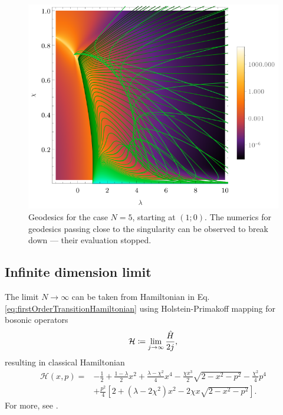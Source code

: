 \begin{figure}[H]
    \centering
    \includegraphics[scale=1.3]{../img/N=5_geods00.pdf}
    \caption{Geodesics for the case $N=5$, starting at $(1;0)$. The numerics for geodesics passing close to the singularity can be observed to break down — their evaluation stopped.}
    \label{fig:geod10}    
\end{figure}







\subsection{Infinite dimension limit}
\label{chap:infiniteDimensionLimit}
The limit $N\rightarrow \infty$ can be taken from Hamiltonian in Eq. \ref{eq:firstOrderTransitionHamiltonian} using Holstein-Primakoff mapping \citet{holstein} for bosonic operators
\begin{equation}
    \mathcal{H}\coloneqq\lim_{j\rightarrow\infty}\frac{\hat{H}}{2j},
\end{equation}
resulting in classical Hamiltonian
\begin{equation}
    \begin{split}
        \mathcal{H}(x,p)=&-\frac{1}{2}+\frac{1-\lambda}{2}x^2+\frac{\lambda-\chi^2}{4}x^4-\frac{\chi x^3}{2}\sqrt{2-x^2-p^2}-\frac{\chi^2}{4}p^4\\
        &+\frac{p^2}{4}\left[2+(\lambda-2\chi^2)x^2-2\chi x\sqrt{2-x^2-p^2}\right].
    \end{split}
    \label{eq:HamiltonianClassicalLimit}
\end{equation}
For more, see \citet{felipe}.

